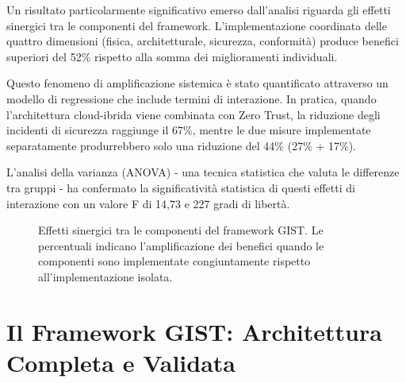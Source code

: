 Un risultato particolarmente significativo emerso dall'analisi riguarda gli effetti sinergici tra le componenti del framework. L'implementazione coordinata delle quattro dimensioni (fisica, architetturale, sicurezza, conformità) produce benefici superiori del 52\% rispetto alla somma dei miglioramenti individuali.

Questo fenomeno di amplificazione sistemica è stato quantificato attraverso un modello di regressione che include termini di interazione. In pratica, quando l'architettura cloud-ibrida viene combinata con Zero Trust, la riduzione degli incidenti di sicurezza raggiunge il 67\%, mentre le due misure implementate separatamente produrrebbero solo una riduzione del 44\% (27\% + 17\%). 

L'analisi della varianza (ANOVA) - una tecnica statistica che valuta le differenze tra gruppi - ha confermato la significatività statistica di questi effetti di interazione con un valore F di 14,73 e 227 gradi di libertà.

\begin{figure}[htbp]
\centering
{}
\caption{Effetti sinergici tra le componenti del framework GIST. Le percentuali indicano l'amplificazione dei benefici quando le componenti sono implementate congiuntamente rispetto all'implementazione isolata.}
\label{fig:synergies}
\end{figure}

\section{\texorpdfstring{\textbf{Il Framework GIST: Architettura Completa e Validata}}{5.3 - Il Framework GIST: Architettura Completa e Validata}}
\label{sec:5.3}

